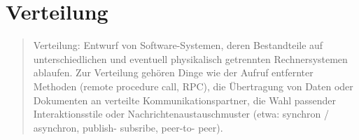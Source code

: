 \section{Verteilung}

\begin{quote}
	Verteilung: Entwurf von Software-Systemen, deren Bestandteile auf unterschiedlichen und eventuell physikalisch getrennten Rechnersystemen ablaufen.
	Zur Verteilung gehören Dinge wie der Aufruf entfernter Methoden (remote procedure call, RPC), die Übertragung von Daten oder Dokumenten an verteilte Kommunikationspartner, die Wahl passender Interaktionsstile oder Nachrichtenaustauschmuster (etwa: synchron / asynchron, publish- subsribe, peer-to- peer).
\end{quote}